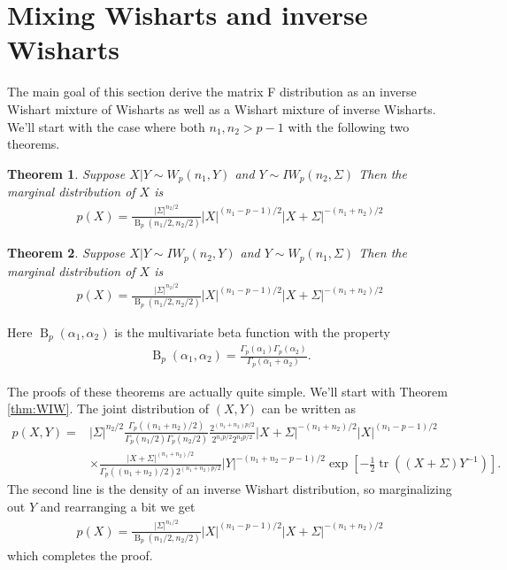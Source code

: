 \documentclass{article}\usepackage[]{graphicx}\usepackage[]{color}
\newtheorem{thm}{Theorem}[subsection]
\DeclareMathOperator{\tr}{tr}
\DeclareMathOperator{\B}{B}
\begin{document}
\section{Mixing Wisharts and inverse Wisharts}
The main goal of this section derive the matrix F distribution as an inverse Wishart mixture of Wisharts as well as a Wishart mixture of inverse Wisharts. We'll start with the case where both $n_1, n_2 > p -1$ with the following two theorems.

\begin{thm}\label{thm:WIW}
  Suppose $X|Y \sim W_p(n_1,Y)$ and $Y\sim IW_p(n_2,\Sigma)$ Then the marginal distribution of $X$ is
  \begin{align*}
    p(X) =  \frac{\left|\Sigma\right|^{n_2/2}}{\B_p(n_1/2,n_2/2)} |X|^{(n_1 - p - 1)/2}  \left|X + \Sigma\right|^{-(n_1 + n_2)/2}
  \end{align*}
\end{thm}

\begin{thm}\label{thm:IWW}
  Suppose $X|Y \sim IW_p(n_2,Y)$ and $Y\sim W_p(n_1,\Sigma)$ Then the marginal distribution of $X$ is
  \begin{align*}
    p(X) =  \frac{\left|\Sigma\right|^{n_2/2}}{\B_p(n_1/2,n_2/2)} |X|^{(n_1 - p-1)/2}  \left|X + \Sigma\right|^{-(n_1 + n_2)/2}
  \end{align*}
\end{thm}
Here $\B_p(\alpha_1, \alpha_2)$ is the multivariate beta function with the property 
\begin{align*}
  \B_p(\alpha_1, \alpha_2) = \frac{\Gamma_p(\alpha_1)\Gamma_p(\alpha_2)}{\Gamma_p(\alpha_1 + \alpha_2)}.
\end{align*}

The proofs of these theorems are actually quite simple. We'll start with Theorem \eqref{thm:WIW}. The joint distribution of $(X,Y)$ can be written as
\begin{align*}
  p(X,Y) = &  |\Sigma|^{n_2/2}\frac{\Gamma_p((n_1 + n_2)/2)}{\Gamma_p(n_1/2)\Gamma_p(n_2/2)}\frac{2^{(n_1 + n_2)p/2}}{2^{n_1p/2}2^{n_2p/2}}\left|X + \Sigma\right|^{-(n_1 + n_2)/2}|X|^{(n_1 - p-1)/2} \\
  &\times \frac{\left|X + \Sigma\right|^{(n_1 + n_2)/2}}{\Gamma_p((n_1 + n_2)/2)2^{(n_1 + n_2)p/2}}|Y|^{-(n_1 + n_2- p-1)/2}\exp\left[-\frac{1}{2}\tr\left( (X + \Sigma ) Y^{-1}\right)\right].
\end{align*}
The second line is the density of an inverse Wishart distribution, so marginalizing out $Y$ and rearranging a bit we get
\begin{align*}
p(X) =  \frac{\left|\Sigma\right|^{n_1/2}}{\B_p(n_1/2,n_2/2)} |X|^{(n_1 - p-1)/2}  \left|X + \Sigma\right|^{-(n_1 + n_2)/2}
\end{align*}
which completes the proof.
\end{document}
